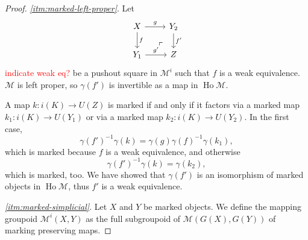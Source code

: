 \documentclass[a4paper]{article}
\newcommand{\todo}[1]{\textcolor{red}{#1}}
\theoremstyle{remark}
\theoremstyle{definition}
\begin{document}
\begin{proof}
  \emph{\ref{itm:marked-left-proper}}.
  Let 
  \begin{equation}
    \begin{tikzcd}
      X \arrow[r, "g"] \arrow[d, "f"] \arrow[dr, phantom, near end, "\ulcorner"] & Y_2 \arrow[d, "f'"] \\
      Y_1 \arrow[r, "g'"] & Z
    \end{tikzcd}
  \end{equation}
  \todo{indicate weak eq?}
  be a pushout square in $\mathcal{M}^i$ such that $f$ is a weak equivalence.
  $\mathcal{M}$ is left proper, so $\gamma(f')$ is invertible as a map in $\operatorname{Ho} \mathcal{M}$.

  A map $k : i(K) \rightarrow U(Z)$ is marked if and only if it factors via a marked map $k_1 : i(K) \rightarrow U(Y_1)$ or via a marked map $k_2 : i(K) \rightarrow U(Y_2)$.
  In the first case,
  \begin{equation}
    \gamma(f')^{-1} \gamma(k) = \gamma(g) \gamma(f)^{-1} \gamma(k_1),
  \end{equation}
  which is marked because $f$ is a weak equivalence, and otherwise
  \begin{equation}
    \gamma(f')^{-1} \gamma(k) = \gamma(k_2),
  \end{equation}
  which is marked, too.
  We have showed that $\gamma(f')$ is an isomorphism of marked objects in $\operatorname{Ho} \mathcal{M}$, thus $f'$ is a weak equivalence.

  \emph{\ref{itm:marked-simplicial}}.
  Let $X$ and $Y$ be marked objects.
  We define the mapping groupoid $\mathcal{M}^i(X, Y)$ as the full subgroupoid of $\mathcal{M}(G(X), G(Y))$ of marking preserving maps.


\end{proof}
\end{document}
